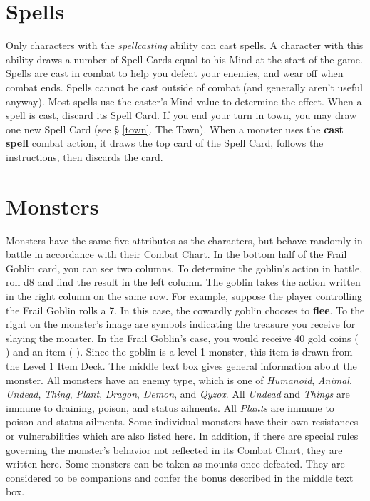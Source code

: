 \documentclass{book}
\begin{document}
\section{Spells} \label{spellcasting}
Only characters with the \emph{spellcasting} ability can cast spells. A character with this ability draws a number of Spell Cards equal to his Mind at the start of the game. Spells are cast in combat to help you defeat your enemies, and wear off when combat ends. Spells cannot be cast outside of combat (and generally aren’t useful anyway).
Most spells use the caster’s Mind value to determine the effect. When a spell is cast, discard its Spell Card. If you end your turn in town, you may draw one new Spell Card (see § \ref{town}. The Town).
When a monster uses the \textbf{cast spell} combat action, it draws the top card of the Spell Card, follows the instructions, then discards the card.

\section{Monsters} \label{monsters}

Monsters have the same five attributes as the characters, but behave randomly in battle in accordance with their Combat Chart. In the bottom half of the Frail Goblin card, you can see two columns. To determine the goblin’s action in battle, roll d8 and find the result in the left column. The goblin takes the action written in the right column on the same row. For example, suppose the player controlling the Frail Goblin rolls a 7. In this case, the cowardly goblin chooses to \textbf{flee}.
To the right on the monster’s image are symbols indicating the treasure you receive for slaying the monster. In the Frail Goblin’s case, you would receive 40 gold coins ( ) and an item ( ). Since the goblin is a level 1 monster, this item is drawn from the Level 1 Item Deck.
The middle text box gives general information about the monster. All monsters have an enemy type, which is one of \emph{Humanoid}, \emph{Animal}, \emph{Undead}, \emph{Thing}, \emph{Plant}, \emph{Dragon}, \emph{Demon}, and \emph{Qyzox}. All \emph{Undead} and \emph{Things} are immune to draining, poison, and status ailments. All \emph{Plants} are immune to poison and status ailments. Some individual monsters have their own resistances or vulnerabilities which are also listed here. In addition, if there are special rules governing the monster’s behavior not reflected in its Combat Chart, they are written here.
Some monsters can be taken as mounts once defeated. They are considered to be companions and confer the bonus described in the middle text box.
\end{document}

